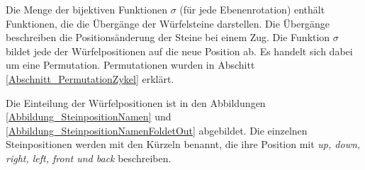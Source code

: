 \documentclass[12pt,a4paper, usenames, dvipsnames]{article}
\theoremstyle{mystyle}
\theoremstyle{definition}
\begin{document}
\label{Abschnitt_PositionenDerSteineImWürfel}

Die Menge der bijektiven Funktionen $\sigma$ (für jede Ebenenrotation) enthält Funktionen, die die Übergänge der Würfelsteine darstellen. Die Übergänge beschreiben die Positionsänderung der Steine bei einem Zug. Die Funktion $\sigma$ bildet jede der Würfelpositionen auf die neue Position ab. Es handelt sich dabei um eine Permutation. Permutationen wurden in Abschitt \ref{Abschnitt_PermutationZykel} erklärt. 

Die Einteilung der Würfelpositionen ist in den Abbildungen \ref{Abbildung_SteinpositionNamen} und \ref{Abbildung_SteinpositionNamenFoldetOut} abgebildet. Die einzelnen Steinpositionen werden mit den Kürzeln benannt, die ihre Position mit \textit{up, down, right, left, front und back} beschreiben.
\end{document}
